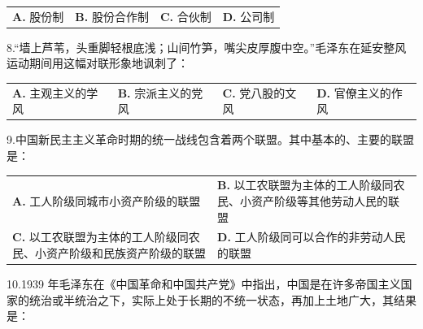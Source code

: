 \documentclass[UTF8,11pt]{ctexart}
\begin{document}
\begin{center}\begin{tabular}{>{\raggedright\arraybackslash}p{\dimexpr(\linewidth-8\tabcolsep)/4\relax}>{\raggedright\arraybackslash}p{\dimexpr(\linewidth-8\tabcolsep)/4\relax}>{\raggedright\arraybackslash}p{\dimexpr(\linewidth-8\tabcolsep)/4\relax}>{\raggedright\arraybackslash}p{\dimexpr(\linewidth-8\tabcolsep)/4\relax}}
\textbf{A.} 股份制 & \textbf{B.} 股份合作制 & \textbf{C.} 合伙制 & \textbf{D.} 公司制\\[.35em]\end{tabular}\end{center}

8.“墙上芦苇，头重脚轻根底浅；山间竹笋，嘴尖皮厚腹中空。”毛泽东在延安整风运动期间用这幅对联形象地讽刺了：


\begin{center}\begin{tabular}{>{\raggedright\arraybackslash}p{\dimexpr(\linewidth-8\tabcolsep)/4\relax}>{\raggedright\arraybackslash}p{\dimexpr(\linewidth-8\tabcolsep)/4\relax}>{\raggedright\arraybackslash}p{\dimexpr(\linewidth-8\tabcolsep)/4\relax}>{\raggedright\arraybackslash}p{\dimexpr(\linewidth-8\tabcolsep)/4\relax}}
\textbf{A.} 主观主义的学风 & \textbf{B.} 宗派主义的党风 & \textbf{C.} 党八股的文风 & \textbf{D.} 官僚主义的作风\\[.35em]\end{tabular}\end{center}

9.中国新民主主义革命时期的统一战线包含着两个联盟。其中基本的、主要的联盟是：


\begin{center}\begin{tabular}{>{\raggedright\arraybackslash}p{\dimexpr(\linewidth-4\tabcolsep)/2\relax}>{\raggedright\arraybackslash}p{\dimexpr(\linewidth-4\tabcolsep)/2\relax}}
\textbf{A.} 工人阶级同城市小资产阶级的联盟 & \textbf{B.} 以工农联盟为主体的工人阶级同农民、小资产阶级等其他劳动人民的联盟\\[.35em]
\textbf{C.} 以工农联盟为主体的工人阶级同农民、小资产阶级和民族资产阶级的联盟 & \textbf{D.} 工人阶级同可以合作的非劳动人民的联盟\\[.35em]\end{tabular}\end{center}

10.1939 年毛泽东在《中国革命和中国共产党》中指出，中国是在许多帝国主义国家的统治或半统治之下，实际上处于长期的不统一状态，再加上土地广大，其结果是：
\end{document}
